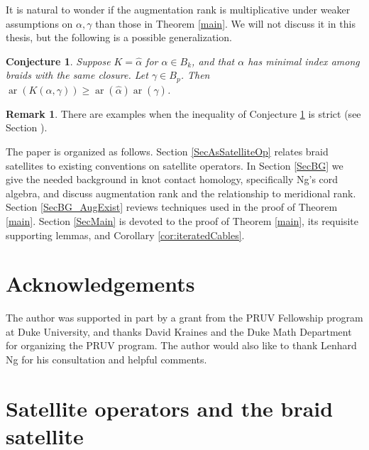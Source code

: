 \documentclass[11pt]{amsart}
\def\ar{\operatorname{ar}}
\newtheorem{conj}[thm]{Conjecture}
\theoremstyle{definition}
\newtheorem{rem}[thm]{Remark}
\begin{document}
It is natural to wonder if the augmentation rank is multiplicative under weaker assumptions on $\alpha, \gamma$ than those in Theorem \ref{main}. We will not discuss it in this thesis, but the following is a possible generalization.

\begin{conj}Suppose $K=\hat{\alpha}$ for $\alpha\in B_k$, and that $\alpha$ has minimal index among braids with the same closure. Let $\gamma\in B_p$. Then $\ar(K(\alpha,\gamma)) \ge \ar(\hat{\alpha})\ar(\hat{\gamma})$.
\label{ConjSuperMultipl}
\end{conj}

\begin{rem}There are examples when the inequality of Conjecture \ref{ConjSuperMultipl} is strict (see Section \cite[Section 5]{CH}).
\label{RemStrictlySuper}
\end{rem}

The paper is organized as follows. Section \ref{SecAsSatelliteOp} relates braid satellites to existing conventions on satellite operators. In Section \ref{SecBG} we give the needed background in knot contact homology, specifically Ng's cord algebra, and discuss augmentation rank and the relationship to meridional rank. Section \ref{SecBG_AugExist} reviews techniques used in the proof of Theorem \ref{main}. Section \ref{SecMain} is devoted to the proof of Theorem \ref{main}, its requisite supporting lemmas, and Corollary \ref{cor:iteratedCables}.



\section*{Acknowledgements}
The author was supported in part by a grant from the PRUV Fellowship program at Duke University, and thanks David Kraines and the Duke Math Department for organizing the PRUV program. The author would also like to thank Lenhard Ng for his consultation and helpful comments.




\section{Satellite operators and the braid satellite}
\label{SecAsSatelliteOp}
\end{document}
